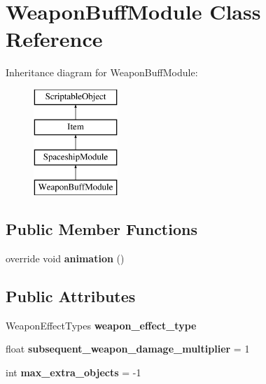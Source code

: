 \hypertarget{class_weapon_buff_module}{}\section{Weapon\+Buff\+Module Class Reference}
\label{class_weapon_buff_module}
Inheritance diagram for Weapon\+Buff\+Module\+:\begin{figure}[H]
\begin{center}
\leavevmode
\includegraphics[height=4.000000cm]{class_weapon_buff_module}
\end{center}
\end{figure}
\subsection*{Public Member Functions}
\begin{DoxyCompactItemize}
\item 
\mbox{\label{class_weapon_buff_module_a6fed9763751011f031abc6b268f21e58}} 
override void {\bfseries animation} ()
\end{DoxyCompactItemize}
\subsection*{Public Attributes}
\begin{DoxyCompactItemize}
\item 
\mbox{\label{class_weapon_buff_module_a0e6e0276a1c21f78389c4876ff0079be}} 
Weapon\+Effect\+Types {\bfseries weapon\+\_\+effect\+\_\+type}
\item 
\mbox{\label{class_weapon_buff_module_a5f22a2b67b783bff7fb00ac70cdd06b2}} 
float {\bfseries subsequent\+\_\+weapon\+\_\+damage\+\_\+multiplier} = 1
\item 
\mbox{\label{class_weapon_buff_module_af3e77a81bbe0d96232b6e8ed51296fdb}} 
int {\bfseries max\+\_\+extra\+\_\+objects} = -\/1
\end{DoxyCompactItemize}
